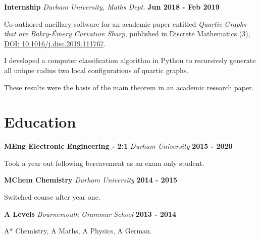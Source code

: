 \documentclass[a4paper, 11pt, hidelinks]{article}
\newcommand{\textsb}[1]{
	\fontseries{sb}\selectfont #1 \normalfont
}
\newcommand{\xp}[3]{
	\vspace{0.25em}
	\textbf{\large#1} \quad \emph{\large#2} \hfill \textbf{\large#3}
}
\begin{document}
\begin{minipage}{0.587\textwidth}
\begin{itemise}
		\hfill
		\href{https://www.francisgurr.com/pages/qfree_internship/qfree_internship.html}{\faLink}
	\end{itemise}
	\xp{Internship}{Durham University, Maths Dept.}{Jun 2018 - Feb 2019}
	\begin{itemise}
		\item Co-authored ancillary software for an academic paper entitled \emph{Quartic Graphs that are Bakry-Émery Curvature Sharp}, published in Discrete Mathematics \textsb{343}(3), \href{https://arxiv.org/abs/1902.10665}{DOI: 10.1016/j.disc.2019.111767}.
		\item I developed a computer classification algorithm in Python to recursively generate all unique radius two local configurations of quartic graphs.
		\item These results were the basis of the main theorem in an academic research paper.
		\hfill
		\href{https://www.francisgurr.com/pages/summer_project/summer_project.html}{\faLink}
	\end{itemise}

	\vspace{-2em}
	\section{Education}
	\xp{MEng Electronic Engineering - 2:1}{Durham University}{2015 - 2020}
	\begin{itemise}
		\item Took a year out following bereavement as an exam only student.
	\end{itemise}
	\xp{MChem Chemistry}{Durham University}{2014 - 2015}
	\begin{itemise}
		\item Switched course after year one.
	\end{itemise}
	\xp{A Levels}{Bournemouth Grammar School}{2013 - 2014}
	\begin{itemise}
		\item A* Chemistry, A Maths, A Physics, A German.
	\end{itemise}


\end{minipage}
\end{document}
